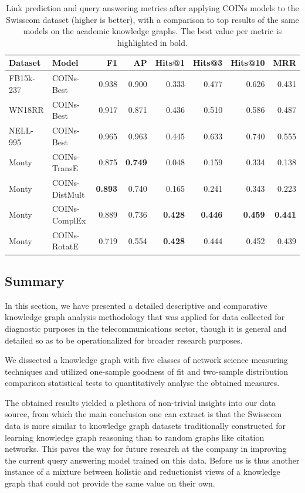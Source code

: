 \begin{table}[!ht]
    \centering
    \caption[Link prediction and query answering metrics after applying COINs models to the Swisscom dataset.]{Link prediction and query answering metrics after applying COINs models to the Swisscom dataset (higher is better), with a comparison to top results of the same models on the academic knowledge graphs. The best value per metric is highlighted in bold.}
    \label{tab:swisscom_coins}
    \begin{tabular}{ll|rr|rrrr}
    \toprule
         Dataset & Model & F1 & AP & Hits@1 & Hits@3 & Hits@10 & MRR \\
    \midrule
         FB15k-237 & COINs-Best & 0.938 & 0.900 & 0.333 & 0.477 & 0.626 & 0.431 \\
         WN18RR & COINs-Best & 0.917 & 0.871 & 0.436 & 0.510 & 0.586 & 0.487 \\
         NELL-995 & COINs-Best & 0.965 & 0.963 & 0.445 & 0.633 & 0.740 & 0.555 \\
         \midrule
         Monty & COINs-TransE & 0.875 & \textbf{0.749} & 0.048 & 0.159 & 0.334 & 0.138 \\
         Monty & COINs-DistMult & \textbf{0.893} & 0.740 & 0.165 & 0.241 & 0.343 & 0.223 \\
         Monty & COINs-ComplEx & 0.889 & 0.736 & \textbf{0.428} & \textbf{0.446} & \textbf{0.459} & \textbf{0.441} \\
         Monty & COINs-RotatE & 0.719 & 0.554 & \textbf{0.428} & 0.444 & 0.452 & 0.439 \\
    \bottomrule
    \end{tabular}
\end{table}

\subsection{Summary}
\label{sec:summary}

In this section, we have presented a detailed descriptive and comparative knowledge graph analysis methodology that was applied for data collected for diagnostic purposes in the telecommunications sector, though it is general and detailed so as to be operationalized for broader research purposes. 

We dissected a knowledge graph with five classes of network science measuring techniques and utilized one-sample goodness of fit and two-sample distribution comparison statistical tests to quantitatively analyse the obtained measures.

The obtained results yielded a plethora of non-trivial insights into our data source, from which the main conclusion one can extract is that the Swisscom data is more similar to knowledge graph datasets traditionally constructed for learning knowledge graph reasoning than to random graphs like citation networks. This paves the way for future research at the company in improving the current query answering model trained on this data. Before us is thus another instance of a mixture between holistic and reductionist views of a knowledge graph that could not provide the same value on their own.
